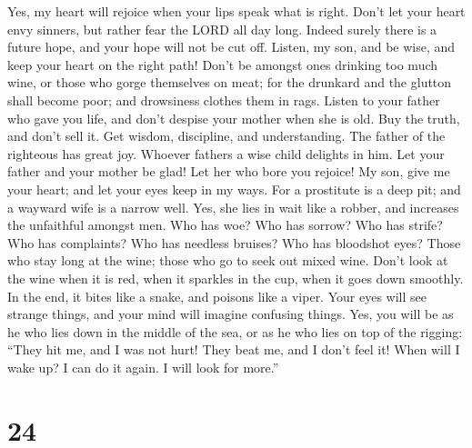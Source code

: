  Yes, my heart will rejoice when your lips speak what is
right.  Don't let your heart envy sinners, but rather fear
the LORD all day long.  Indeed surely there is a future
hope, and your hope will not be cut off.  Listen, my son,
and be wise, and keep your heart on the right path!  Don't
be amongst ones drinking too much wine, or those who gorge themselves on
meat;  for the drunkard and the glutton shall become poor;
and drowsiness clothes them in rags.  Listen to your father
who gave you life, and don't despise your mother when she is old.
 Buy the truth, and don't sell it. Get wisdom, discipline,
and understanding.  The father of the righteous has great
joy. Whoever fathers a wise child delights in him.  Let
your father and your mother be glad! Let her who bore you rejoice!
 My son, give me your heart; and let your eyes keep in my
ways.  For a prostitute is a deep pit; and a wayward wife
is a narrow well.  Yes, she lies in wait like a robber, and
increases the unfaithful amongst men.  Who has woe? Who has
sorrow? Who has strife? Who has complaints? Who has needless bruises?
Who has bloodshot eyes?  Those who stay long at the wine;
those who go to seek out mixed wine.  Don't look at the
wine when it is red, when it sparkles in the cup, when it goes down
smoothly.  In the end, it bites like a snake, and poisons
like a viper.  Your eyes will see strange things, and your
mind will imagine confusing things.  Yes, you will be as he
who lies down in the middle of the sea, or as he who lies on top of the
rigging:  ``They hit me, and I was not hurt! They beat me,
and I don't feel it! When will I wake up? I can do it again. I will look
for more.''

\hypertarget{section-19}{%
\section{24}\label{section-19}}

